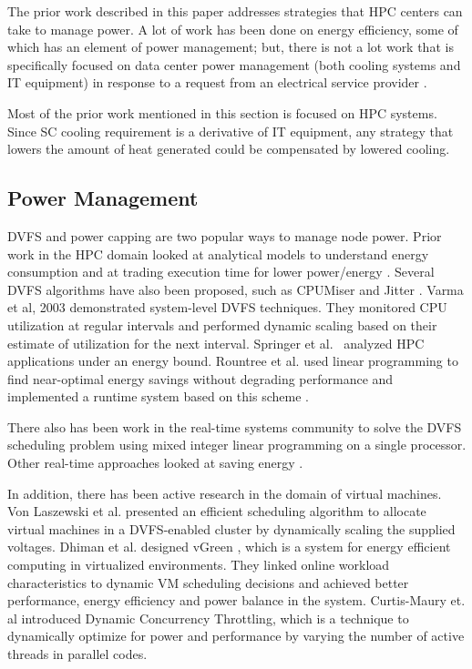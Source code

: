 The prior work described in this paper addresses strategies
that HPC centers can take to manage power. A lot of work has been done on
energy efficiency, some of which has an element of power management; but,
there is not a lot work that is specifically focused on data center power management (both cooling systems and IT equipment) in
response to a request from an electrical service provider %
\cite {Ghatikar2012a}.

Most of the prior work mentioned in this section is focused on HPC systems. 
Since SC cooling requirement is a derivative of IT equipment, any strategy that lowers the amount of heat generated could be compensated by lowered cooling.


\subsection{Power Management}

DVFS and power capping are two popular ways to manage node power. Prior work in the HPC domain looked at analytical models to understand energy consumption \cite{SpringerPPoPP2006,GeICPP2007,LiHPCA2006} and at trading execution time for lower power/energy \cite{CameronSC2005,HsuSC2005}. Several DVFS algorithms have also been proposed, such as CPUMiser \cite{GeICPP2007} and Jitter \cite{KappiahSC2005}. Varma et al, 2003 \cite{varma_control-theoretic_2003} demonstrated system-level DVFS techniques. They monitored CPU utilization at regular intervals and performed dynamic scaling based on their estimate of utilization for the next interval. Springer et al.~\cite{springer:06} analyzed HPC applications under an energy bound. Rountree et al. used linear programming to find near-optimal energy savings without degrading performance \cite{rountree:07} and implemented a runtime system based on this scheme \cite{rountree:09}. 

There also has been work in the real-time systems community to solve the DVFS scheduling problem using mixed integer linear programming on a single processor\cite{IshiharaISLPED1998,SaputraLCTES2002,SwaminathanRTSS2000,SwaminathanASPDAC2001}. Other real-time approaches looked at saving energy \cite{MoncusiRTSS2003,MochockiICCAD2002,MochockiRTAS2005,ZhuTPDS2003,ZhangDAC2002}. 

In addition, there has been active research in the domain of virtual machines. Von Laszewski et al. \cite{von_laszewski_power-aware_2009} presented an efficient scheduling algorithm to allocate virtual machines in a DVFS-enabled cluster by
dynamically scaling the supplied voltages. Dhiman et al. designed vGreen \cite{dhiman_vgreen:_2009}, which is a system for energy efficient computing in
virtualized environments. They linked online workload characteristics to dynamic VM scheduling decisions and achieved better performance, energy
efficiency and power balance in the system. Curtis-Maury et. al \cite{Curtis1,Curtis2,Curtis3} introduced Dynamic Concurrency Throttling, which is a technique to dynamically optimize for power and performance by varying the number of active threads in parallel codes. 

